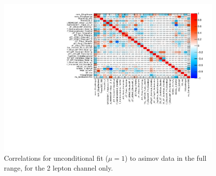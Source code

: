 \begin{figure}[ht]
      \centering
        \includegraphics[width=\linewidth]{figures/2lep/FitResults/corr_HighCorrNoMCStat_AsimovAllbins.pdf}
        \caption{Correlations for unconditional fit ($\mu=1$) to asimov data in the full range, for the 2 lepton channel only.}
       \label{fig:fit_2lep_corr_all}
\end{figure}


